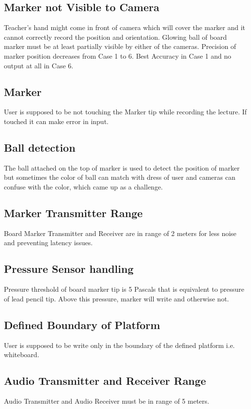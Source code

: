\subsection{Marker not Visible to Camera}
Teacher's hand might come in front of camera which will cover the marker and it cannot correctly record the position and orientation. Glowing ball of board marker must be at least partially visible by either of the cameras. Precision of marker position decreases from Case 1 to 6. Best Accuracy in Case 1 and no output at all in Case 6.
\bigskip

\subsection{Marker}
User is supposed to be not touching the Marker tip while recording the lecture. If touched it can make error in input.
\bigskip

\subsection{Ball detection}
The ball attached on the top of marker is used to detect the position of marker but sometimes the color of ball can match with dress of user and cameras can confuse with the color, which came up as a challenge.

\subsection{Marker Transmitter Range}
Board Marker Transmitter and Receiver are in range of 2 meters for less noise and preventing latency issues.

\subsection{Pressure Sensor handling}
Pressure threshold of board marker tip is 5 Pascals that is equivalent to pressure of lead pencil tip. Above this pressure, marker will write and otherwise not.

\subsection{Defined Boundary of Platform}
User is supposed to be write only in the boundary of the defined platform i.e. whiteboard. 

\subsection{Audio Transmitter and Receiver Range}
Audio Transmitter and Audio Receiver must be in range of 5 meters.

